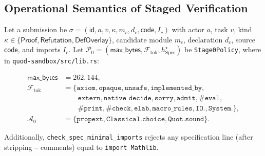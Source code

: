 \documentclass[sigplan,nonacm,10pt]{acmart}
\newcommand{\Spec}{\mathrm{Spec}}
\newcommand{\AxiomsZero}{\mathcal{A}_0}
\newcommand{\kw}[1]{\mathsf{#1}}
\newcommand{\code}[1]{\texttt{#1}}
\begin{document}
\subsection{Operational Semantics of Staged Verification}
Let a submission be $\sigma = (\kw{id}, a, v, \kappa, m_c, d_c, \kw{code}, I_c)$ with actor $a$, task $v$, kind $\kappa \in \{\kw{Proof}, \kw{Refutation}, \kw{DefOverlay}\}$, candidate module $m_c$, declaration $d_c$, source $\kw{code}$, and imports $I_c$. Let $\mathcal{P}_0 = (\kw{max\_bytes}, \mathcal{F}_{\mathrm{tok}}, h_{\Spec}^{\star})$ be \code{Stage0Policy}, where in \code{quod-sandbox/src/lib.rs}:
\begin{small}
\begin{align*}
\kw{max\_bytes} &= 262{,}144, \\
\mathcal{F}_{\mathrm{tok}} &= \{\code{axiom}, \code{opaque}, \code{unsafe}, \code{implemented\_by}, \\
&\qquad \code{extern}, \code{native\_decide}, \code{sorry}, \code{admit}, \code{\#eval}, \\
&\qquad \code{\#print}, \code{\#check}, \code{elab}, \code{macro\_rules}, \code{IO.}, \code{System.}\}, \\
\AxiomsZero &= \{\code{propext},\allowbreak \code{Classical.choice},\allowbreak \code{Quot.sound}\}.
\end{align*}
\end{small}
Additionally, \code{check\_\-spec\_\-minimal\_\-imports} rejects any specification line (after stripping \code{--} comments) equal to \code{import Mathlib}.
\end{document}
